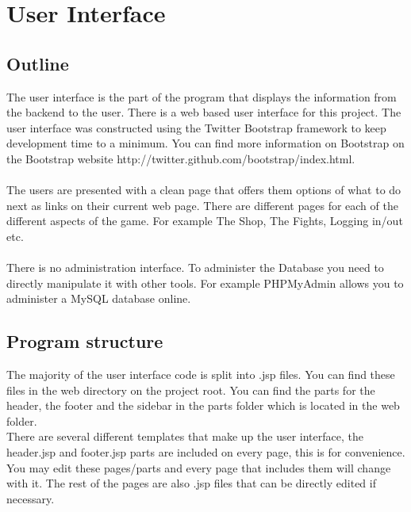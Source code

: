 \documentclass[titlepage]{article}
\begin{document}
{\section {User Interface}
\subsection {Outline}
The user interface is the part of the program that displays the information from the backend to the user. There is a web based user interface for this project. The user interface was constructed using the Twitter Bootstrap framework to keep development time to a minimum. You can find more information on Bootstrap on the Bootstrap website http://twitter.github.com/bootstrap/index.html.
\\
\\
The users are presented with a clean page that offers them options of what to do next as links on their current web page. There are different pages for each of the different aspects of the game. For example The Shop, The Fights, Logging in/out etc.
\\
\\
There is no administration interface. To administer the Database you need to directly manipulate it with other tools. For example PHPMyAdmin allows you to administer a MySQL database online.
\subsection {Program structure}
The majority of the user interface code is split into .jsp files. You can find these files in the web directory on the project root. You can find the parts for the header, the footer and the sidebar in the parts folder which is located in the web folder.
\\
There are several different templates that make up the user interface, the header.jsp and footer.jsp parts are included on every page, this is for convenience. You may edit these pages/parts and every page that includes them will change with it. The rest  of the pages are also .jsp files that can be directly edited if necessary.
}
\end{document}
